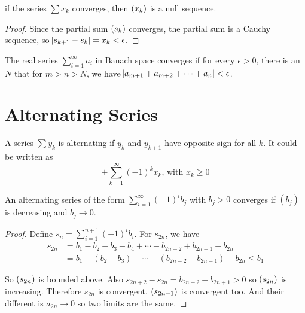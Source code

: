 \begin{theorem}\label{convergent_series_is_null_sequence}
    if the series $\sum x_k$ converges, then $\sequence{x_k}$ is a null sequence.
\end{theorem}
\begin{proof}
    Since the partial sum $\sequence{s_k}$ converges, the partial sum is a Cauchy sequence, so $\abs{s_{k+1} - s_k} = x_k < \epsilon$.
\end{proof}


\begin{theorem}\label{cauchy_convergent_criterion}
    The real series $\sum_{i=1}^\infty a_i$ in Banach space converges if for every $\epsilon > 0$, there is an $N$ that for $m > n > N$, we have $\abs{a_{m+1} + a_{m+2} + \cdots + a_n} < \epsilon$.
\end{theorem}



\section{Alternating Series}

\begin{definition}
    A series $\sum y_k$ is alternating if $y_k$ and $y_{k+1}$ have opposite sign for all $k$. It could be written as
    \begin{equation}
        \pm \sum_{k=1}^\infty (-1)^k x_k \text{, with } x_k \geq 0
    \end{equation}
\end{definition}


\begin{theorem}
    An alternating series of the form $\sum_{i=1}^\infty (-1)^i b_j$ with $b_j > 0$ converges if $(b_j)$ is decreasing and $b_j \rightarrow 0$.
\end{theorem}
\begin{proof}
    Define $s_n = \sum_{i=1}^{n+1} (-1)^i b_i$. For $s_{2n}$, we have
    \begin{equation}
        \begin{aligned}
            s_{2n} &= b_1 - b_2 + b_3 - b_4 + \cdots -b_{2n-2} + b_{2n-1} - b_{2n} \\
            &= b_1 - (b_2 - b_3) - \cdots - (b_{2n-2} - b_{2n-1}) - b_{2n} \leq b_1
        \end{aligned}
    \end{equation}
    
    So $\sequence{s_{2n}}$ is bounded above. Also $s_{2n+2} - s_{2n} = b_{2n+2} - b_{2n+1} > 0$ so $\sequence{s_{2n}}$ is increasing. Therefore $s_{2n}$ is convergent. $\sequence{s_{2n-1}}$ is convergent too. And their different is $a_{2n} \rightarrow 0$ so two limits are the same.
\end{proof}




